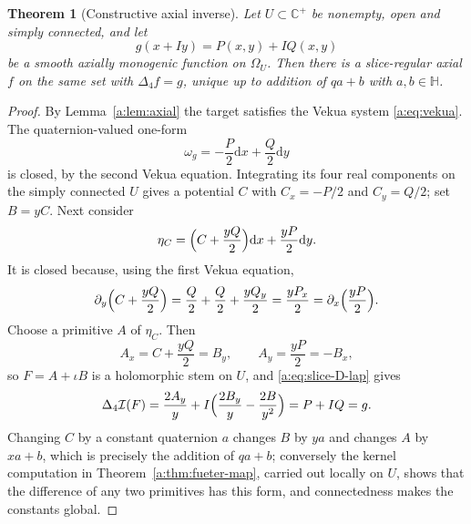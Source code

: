 \documentclass[11pt,a4paper]{article}
\numberwithin{equation}{section}
\newtheorem{theorem}{Theorem}[section]
\theoremstyle{definition}
\theoremstyle{remark}
\theoremstyle{plain}
\newcommand{\HH}{\mathbb H}
\newcommand{\CC}{\mathbb C}
\newcommand{\Cplus}{\CC^{+}}
\newcommand{\lap}{\Delta_4}
\newcommand{\I}{\mathcal I}
\newcommand{\Om}{\Omega}
\newcommand{\om}{\omega}
\newcommand{\etaC}{\eta_{C}}
\newcommand{\pot}{C}          %
\newcommand{\dd}{\mathrm d}
\begin{document}
\begin{theorem}[Constructive axial inverse]
\label{a:thm:local-inverse}
Let $U\subset\Cplus$ be nonempty, open and \emph{simply connected}, and let
\[
 g(x+Iy)=P(x,y)+IQ(x,y)
\]
be a smooth axially monogenic function on $\Om_U$. Then there is a
slice-regular axial $f$ on the same set with $\lap f=g$, unique up to addition
of $qa+b$ with $a,b\in\HH$.
\end{theorem}

\begin{proof}
By Lemma~\ref{a:lem:axial} the target satisfies the Vekua system
\eqref{a:eq:vekua}. The quaternion-valued one-form
\begin{equation}
 \om_g=-\frac P2\dd x+\frac Q2\dd y
 \label{a:eq:inverse-first}
\end{equation}
is closed, by the second Vekua equation. Integrating its four real components
on the simply connected $U$ gives a potential $\pot$ with
$\pot_x=-P/2$ and $\pot_y=Q/2$; set $B=y\pot$. Next consider
\begin{equation}
 \etaC=\Bigl(\pot+\frac{yQ}{2}\Bigr)\dd x+\frac{yP}{2}\dd y .
 \label{a:eq:inverse-second}
\end{equation}
It is closed because, using the first Vekua equation,
\[
 \partial_y\Bigl(\pot+\frac{yQ}{2}\Bigr)
 =\frac Q2+\frac Q2+\frac{yQ_y}{2}
 =\frac{yP_x}{2}
 =\partial_x\Bigl(\frac{yP}{2}\Bigr).
\]
Choose a primitive $A$ of $\etaC$. Then
\[
 A_x=\pot+\frac{yQ}{2}=B_y,\qquad A_y=\frac{yP}{2}=-B_x ,
\]
so $F=A+\iota B$ is a holomorphic stem on $U$, and
\eqref{a:eq:slice-D-lap} gives
\[
 \lap\I(F)=\frac{2A_y}{y}+I\Bigl(\frac{2B_y}{y}-\frac{2B}{y^2}\Bigr)
 =P+IQ=g .
\]
Changing $\pot$ by a constant quaternion $a$ changes $B$ by $ya$ and changes
$A$ by $xa+b$, which is precisely the addition of $qa+b$; conversely the
kernel computation in Theorem~\ref{a:thm:fueter-map}, carried out locally on
$U$, shows that the difference of any two primitives has this form, and
connectedness makes the constants global.
\end{proof}
\end{document}
